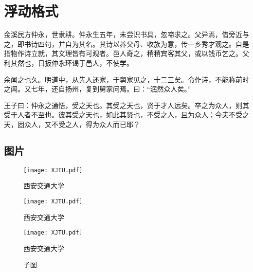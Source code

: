 \chapter{浮动格式}
    金溪民方仲永，世隶耕。仲永生五年，未尝识书具，忽啼求之。父异焉，借旁近与之，即书诗四句，并自为其名。其诗以养父母、收族为意，传一乡秀才观之。自是指物作诗立就，其文理皆有可观者。邑人奇之，稍稍宾客其父，或以钱币乞之。父利其然也，日扳仲永环谒于邑人，不使学。

    余闻之也久。明道中，从先人还家，于舅家见之，十二三矣。令作诗，不能称前时之闻。又七年，还自扬州，复到舅家问焉。曰：“泯然众人矣。”

    王子曰：仲永之通悟，受之天也。其受之天也，贤于才人远矣。卒之为众人，则其受于人者不至也。彼其受之天也，如此其贤也，不受之人，且为众人；今夫不受之天，固众人，又不受之人，得为众人而已耶？

    \section{图片}
        \begin{figure}[!ht]
          \centering
          \texttt{[image: XJTU.pdf]}
          \caption{西安交通大学}
          \label{fig:xjtu}
        \end{figure}

        \begin{figure}[!ht]
          \begin{minipage}{0.45\textwidth}
              \centering
              \texttt{[image: XJTU.pdf]}
              \caption{西安交通大学}
              \label{fig:xjtu-left}
          \end{minipage}
          \begin{minipage}{0.45\textwidth}
              \centering
              \texttt{[image: XJTU.pdf]}
              \caption{西安交通大学}
              \label{fig:xjtu-right}
          \end{minipage}
        \end{figure}
          
        \begin{figure}[!ht]
          \centering
          \caption{子图}
        \end{figure}
          

